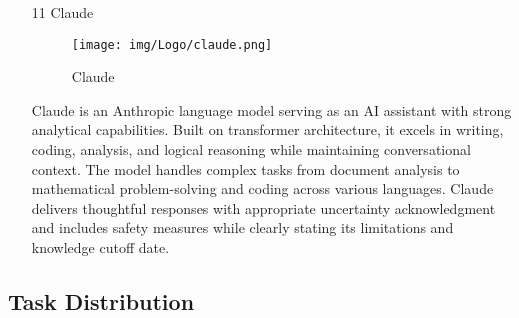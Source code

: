 \documentclass[conference]{IEEEtran}
\begin{document}
\begin{enumerate}
    \item[11] Claude\par
    \vspace{3em}
    \begin{figure}[h]
    \centering
    \texttt{[image: img/Logo/claude.png]}
    \centering
    \caption{Claude} 
    \end{figure}\par
    \vspace{3em}
    Claude is an Anthropic language model serving as an AI assistant with strong analytical capabilities. Built on transformer architecture, it excels in writing, coding, analysis, and logical reasoning while maintaining conversational context. The model handles complex tasks from document analysis to mathematical problem-solving and coding across various languages. Claude delivers thoughtful responses with appropriate uncertainty acknowledgment and includes safety measures while clearly stating its limitations and knowledge cutoff date.
\end{enumerate}

\vspace{0.7em} %
\newpage

\subsection{Task Distribution}
\vspace{0.5em}
\end{document}

